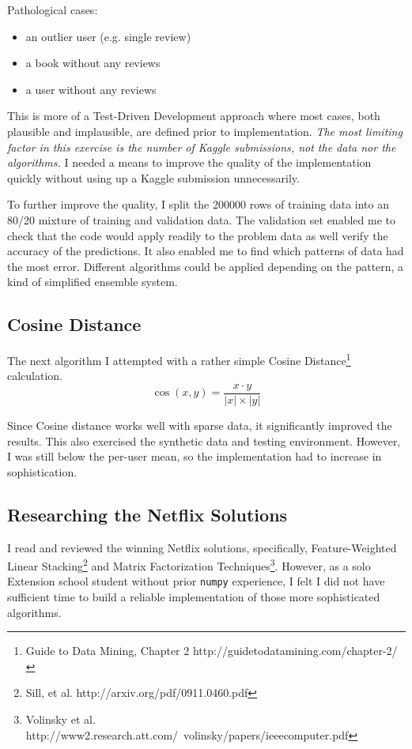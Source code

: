 \documentclass[11pt, oneside]{article}   	%
\begin{document}
Pathological cases:
\begin{itemize}
  \item an outlier user (e.g. single review)
  \item a book without any reviews
  \item a user without any reviews
\end{itemize}

This is more of a Test-Driven Development approach where most cases, both plausible and implausible, are defined prior to implementation. \emph{The most limiting factor in this exercise is the number of Kaggle submissions, not the data nor the algorithms.} I needed a means to improve the quality of the implementation quickly without using up a Kaggle submission unnecessarily. 

To further improve the quality, I split the 200000 rows of training data into an 80/20 mixture of training and validation data. The validation set enabled me to check that the code would apply readily to the problem data as well verify the accuracy of the predictions. It also enabled me to find which patterns of data had the most error. Different algorithms could be applied depending on the pattern, a kind of simplified ensemble system.

\subsection*{Cosine Distance}

The next algorithm I attempted with a rather simple Cosine Distance\footnote{Guide to Data Mining, Chapter 2 http://guidetodatamining.com/chapter-2/}
calculation.
\begin{equation}
\cos(x,y) = \frac{x\cdot y}{|x|\times |y|}
\end{equation}

Since Cosine distance works well with sparse data, it significantly improved the results. This also exercised the synthetic data and testing environment. However, I was still below the per-user mean, so the implementation had to increase in sophistication.

\subsection*{Researching the Netflix Solutions}

I read and reviewed the winning Netflix solutions, specifically, Feature-Weighted Linear Stacking\footnote{Sill, et al. http://arxiv.org/pdf/0911.0460.pdf} and Matrix Factorization Techniques\footnote{Volinsky et al. http://www2.research.att.com/~volinsky/papers/ieeecomputer.pdf}. However, as a solo Extension school student without prior \texttt{numpy} experience, I felt I did not have sufficient time to build a reliable implementation of those more sophisticated algorithms. 
\end{document}
